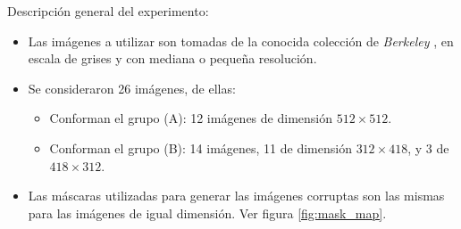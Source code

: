 Descripci\'on general del experimento:
\begin{itemize}
	\item Las im\'agenes a utilizar son tomadas de la conocida colecci\'on de \textit{Berkeley} \cite{besser1990visual}, en escala de grises y con mediana o pequeña resoluci\'on.
	\item Se consideraron 26 im\'agenes, de ellas:
	\begin{itemize}
		\item Conforman el grupo (A): 12 im\'agenes de dimensi\'on $512 \times 512$.
		\item Conforman el grupo (B): 14 im\'agenes, 11 de dimensi\'on $312 \times 418$, y 3 de $418 \times 312$.
	\end{itemize}
	\item Las m\'ascaras utilizadas para generar las im\'agenes corruptas son las mismas para las im\'agenes de igual dimensión. Ver figura \ref{fig:mask_map}.
	\begin{figure}[H]
		\centering
		\quad
		\quad

\end{figure}
\end{itemize}
